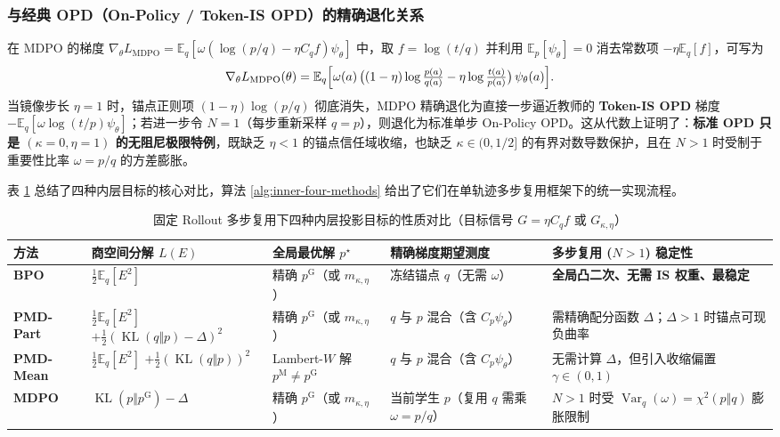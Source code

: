 \documentclass[lang=cn,scheme=chinese,openany]{../book/elegantbook}
\newcommand{\E}{\mathbb E}
\newcommand{\KL}{\operatorname{KL}}
\newcommand{\Var}{\operatorname{Var}}
\begin{document}
\subsubsection*{与经典 OPD（On-Policy / Token-IS OPD）的精确退化关系}
在 MDPO 的梯度 $\nabla_\theta L_{\mathrm{MDPO}}=\E_q[\omega(\log(p/q)-\eta C_q f)\psi_\theta]$ 中，取 $f=\log(t/q)$ 并利用 $\E_p[\psi_\theta]=0$ 消去常数项 $-\eta\E_q[f]$，可写为
\begin{equation}
 \nabla_\theta L_{\mathrm{MDPO}}(\theta)
 =\E_q\Bigl[\omega(a)\,\bigl((1-\eta)\log\tfrac{p(a)}{q(a)}-\eta\log\tfrac{t(a)}{p(a)}\bigr)\,\psi_\theta(a)\Bigr].
\end{equation}
当镜像步长 $\eta=1$ 时，锚点正则项 $(1-\eta)\log(p/q)$ 彻底消失，MDPO 精确退化为直接一步逼近教师的 \textbf{Token-IS OPD} 梯度 $-\E_q[\omega\log(t/p)\psi_\theta]$；若进一步令 $N=1$（每步重新采样 $q=p$），则退化为标准单步 On-Policy OPD。这从代数上证明了：\textbf{标准 OPD 只是 $(\kappa=0,\eta=1)$ 的无阻尼极限特例}，既缺乏 $\eta<1$ 的锚点信任域收缩，也缺乏 $\kappa\in(0,1/2]$ 的有界对数导数保护，且在 $N>1$ 时受制于重要性比率 $\omega=p/q$ 的方差膨胀。

表 \ref{tab:four-inner-summary} 总结了四种内层目标的核心对比，算法 \ref{alg:inner-four-methods} 给出了它们在单轨迹多步复用框架下的统一实现流程。

\begin{table}[htbp]
\centering
\caption{固定 Rollout 多步复用下四种内层投影目标的性质对比（目标信号 $G=\eta C_q f$ 或 $G_{\kappa,\eta}$）}
\label{tab:four-inner-summary}
\small
\begin{tabularx}{\textwidth}{@{}lXXXX@{}}
\toprule
方法 & 商空间分解 $L(E)$ & 全局最优解 $p^\star$ & 精确梯度期望测度 & 多步复用 ($N>1$) 稳定性 \\
\midrule
\textbf{BPO} & $\frac12\E_q[E^2]$ & 精确 $p^{\mathrm G}$（或 $m_{\kappa,\eta}$） & 冻结锚点 $q$（无需 $\omega$） & \textbf{全局凸二次、无需 IS 权重、最稳定} \\
\textbf{PMD-Part} & $\frac12\E_q[E^2]$ $+\frac12(\KL(q\Vert p)-\Delta)^2$ & 精确 $p^{\mathrm G}$（或 $m_{\kappa,\eta}$） & $q$ 与 $p$ 混合（含 $C_p\psi_\theta$） & 需精确配分函数 $\Delta$；$\Delta>1$ 时锚点可现负曲率 \\
\textbf{PMD-Mean} & $\frac12\E_q[E^2]$ $+\frac12(\KL(q\Vert p))^2$ & Lambert-$W$ 解 $p^{\mathrm M}\ne p^{\mathrm G}$ & $q$ 与 $p$ 混合（含 $C_p\psi_\theta$） & 无需计算 $\Delta$，但引入收缩偏置 $\gamma\in(0,1)$ \\
\textbf{MDPO} & $\KL(p\Vert p^{\mathrm G})-\Delta$ & 精确 $p^{\mathrm G}$（或 $m_{\kappa,\eta}$） & 当前学生 $p$（复用 $q$ 需乘 $\omega=p/q$） & $N>1$ 时受 $\Var_q(\omega)=\chi^2(p\Vert q)$ 膨胀限制 \\
\bottomrule
\end{tabularx}
\end{table}
\end{document}
